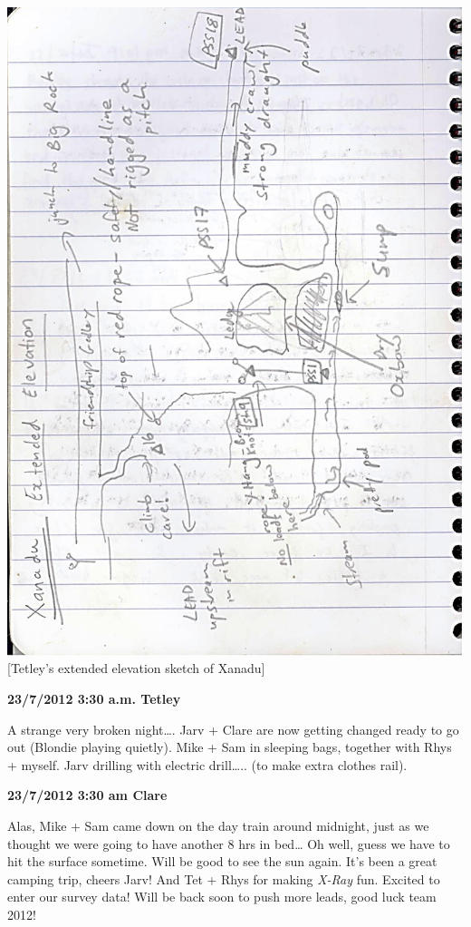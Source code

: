 \includegraphics{UgLog1012/72.jpeg}\\
{[}Tetley's extended elevation sketch of Xanadu{]}

\textbf{23/7/2012 3:30 a.m. Tetley}

A strange very broken night\ldots{}. Jarv + Clare are now getting
changed ready to go out (Blondie playing quietly). Mike + Sam in
sleeping bags, together with Rhys + myself. Jarv drilling with electric
drill\ldots{}.. (to make extra clothes rail).

\textbf{23/7/2012 3:30 am Clare}

Alas, Mike + Sam came down on the day train around midnight, just as we
thought we were going to have another 8 hrs in bed\ldots{} Oh well,
guess we have to hit the surface sometime. Will be good to see the sun
again. It's been a great camping trip, cheers Jarv! And Tet + Rhys for
making \emph{X-Ray} fun. Excited to enter our survey data! Will be back
soon to push more leads, good luck team 2012!

